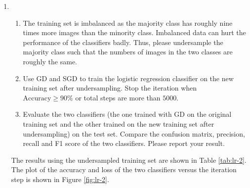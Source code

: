 \begin{exercise}
\begin{enumerate}
\begin{solution}
                {\bf Comments:}
                \begin{itemize}
                    \item The stochastic gradient descent is much faster than the full gradient descent when computing gradient, and needs less iterations to reach the same accuracy by introducing randomness.
                    \item We only measure the time cost for computing the gradient and updating the model parameter. However, as we need to plot the accuracy score, we always compute the full probability vector in each iteration, which cause the stochastic gradient descent to be as slow as the full gradient descent in practice.
                    \item The speed of convergence tends to be faster when the regularization term is set to be larger. This is due to the imbalanced nature of the training set. When the weights are all equal to zero, the model will predict the majority class for all the images, which will result in a high accuracy near $90\%$. This also explains why the recall is getting lower when the regularization term is set to be larger.
                        \qedhere
                \end{itemize}
            \end{solution}

        \item
            \begin{enumerate}
                \item The training set is imbalanced as the majority class has roughly nine times more images than the minority class. Imbalanced data can hurt the performance of the classifiers badly. Thus, please undersample the majority class such that the numbers of images in the two classes are roughly the same.
                \item Use GD and SGD to train the logistic regression classifier on the new training set after undersampling. Stop the iteration when $\text{Accuracy}\geq 90\%$ or total steps are more than $5000$.
                \item Evaluate the two classifiers (the one trained with GD on the original training set and the other trained on the new training set after undersampling) on the test set. Compare the confusion matrix, precision, recall and F1 score of the two classifiers. Please report your result.
            \end{enumerate}

            \begin{solution}
                The results using the undersampled training set are shown in Table \ref{tab:lr-2}. The plot of the accuracy and loss of the two classifiers versus the iteration step is shown in Figure \ref{fig:lr-2}.


\end{solution}
\end{enumerate}
\end{exercise}

